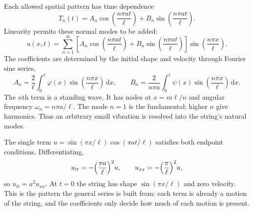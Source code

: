 Each allowed spatial pattern has time dependence
\begin{equation}
T_n(t)=A_n\cos\left(\frac{n\pi at}{\ell}\right)
+B_n\sin\left(\frac{n\pi at}{\ell}\right).
\end{equation}
Linearity permits these normal modes to be added:
\begin{equation}
u(x,t)=\sum_{n=1}^{\infty}
\left[A_n\cos\left(\frac{n\pi at}{\ell}\right)
+B_n\sin\left(\frac{n\pi at}{\ell}\right)\right]
\sin\left(\frac{n\pi x}{\ell}\right).
\label{eq:ch04-string-series}
\end{equation}
The coefficients are determined by the initial shape and velocity through Fourier sine series,
\begin{equation}
A_n=\frac{2}{\ell}\int_0^\ell\varphi(x)\sin\left(\frac{n\pi x}{\ell}\right)\,\mathrm{d}x,
\qquad
B_n=\frac{2}{n\pi a}\int_0^\ell\psi(x)\sin\left(\frac{n\pi x}{\ell}\right)\,\mathrm{d}x.
\end{equation}
The $n$th term is a standing wave. It has nodes at $x=m\ell/n$ and angular frequency $\omega_n=n\pi a/\ell$. The mode $n=1$ is the fundamental; higher $n$ give harmonics. Thus an arbitrary small vibration is resolved into the string's natural modes.

\begin{example}
The single term $u=\sin(\pi x/\ell)\cos(\pi a t/\ell)$ satisfies both endpoint conditions. Differentiating,
\begin{equation}
u_{tt}=-\Bigl(\frac{\pi a}{\ell}\Bigr)^2 u,
\qquad
u_{xx}=-\Bigl(\frac{\pi}{\ell}\Bigr)^2 u,
\end{equation}
so $u_{tt}=a^2 u_{xx}$. At $t=0$ the string has shape $\sin(\pi x/\ell)$ and zero velocity. This is the pattern the general series is built from: each term is already a motion of the string, and the coefficients only decide how much of each motion is present.
\end{example}

